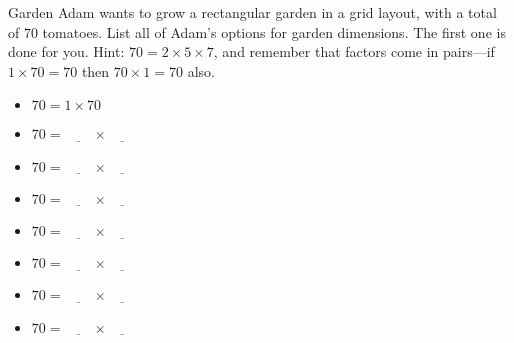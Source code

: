 \documentclass[12pt,letterpaper]{article}
\begin{document}
\begin{problem}{Garden}
 Adam wants to grow a rectangular garden in a grid layout, with a total
 of $70$ tomatoes. List all of Adam's options for garden dimensions.
 The first one is done for you. Hint: $70=2\times5\times7$, and remember
 that factors come in pairs---if $1 \times 70 = 70$ then $70 \times 1 = 70$
 also.

 \begin{itemize}
  \item $70 = 1 \times 70$
  \item $70 = \underline{\hspace{2em}} \times \underline{\hspace{2em}}$
  \item $70 = \underline{\hspace{2em}} \times \underline{\hspace{2em}}$
  \item $70 = \underline{\hspace{2em}} \times \underline{\hspace{2em}}$
  \item $70 = \underline{\hspace{2em}} \times \underline{\hspace{2em}}$
  \item $70 = \underline{\hspace{2em}} \times \underline{\hspace{2em}}$
  \item $70 = \underline{\hspace{2em}} \times \underline{\hspace{2em}}$
  \item $70 = \underline{\hspace{2em}} \times \underline{\hspace{2em}}$
 \end{itemize}
\end{problem}
\end{document}

